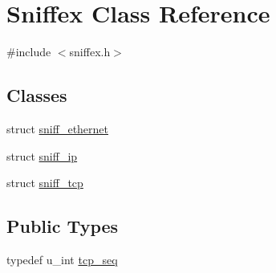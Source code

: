 \hypertarget{class_sniffex}{}\section{Sniffex Class Reference}
\label{class_sniffex}


{\ttfamily \#include $<$sniffex.\+h$>$}

\subsection*{Classes}
\begin{DoxyCompactItemize}
\item 
struct \mbox{\hyperlink{struct_sniffex_1_1sniff__ethernet}{sniff\+\_\+ethernet}}
\item 
struct \mbox{\hyperlink{struct_sniffex_1_1sniff__ip}{sniff\+\_\+ip}}
\item 
struct \mbox{\hyperlink{struct_sniffex_1_1sniff__tcp}{sniff\+\_\+tcp}}
\end{DoxyCompactItemize}
\subsection*{Public Types}
\begin{DoxyCompactItemize}
\item 
typedef u\+\_\+int \mbox{\hyperlink{class_sniffex_a83629f6a3ec687dd2bb381e9bf157d4f}{tcp\+\_\+seq}}
\end{DoxyCompactItemize}
